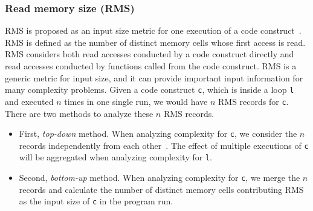 \subsubsection{Read memory size (RMS)}
RMS is proposed as an input size metric for one 
execution of a code construct~\cite{Aprof1,Aprof2}. 
RMS is defined as the number of distinct memory cells 
whose first access is read. 
RMS considers both read accesses conducted by a code construct directly 
and read accesses conducted by 
functions called from the code construct. 
RMS is a generic metric for input size, 
and it can provide important input information for many complexity problems.   
Given a code construct \texttt{c}, which is inside a loop \texttt{l} and executed
$n$ times in one single run, 
we would have $n$ RMS records for \texttt{c}. 
There are two methods to analyze these $n$ RMS records.

\begin{itemize}

\item First, \textit{top-down} method. 
When analyzing complexity for \texttt{c}, 
we consider the $n$ records independently from each other~\cite{Aprof1,Aprof2}. 
The effect of multiple executions of \texttt{c} 
will be aggregated when analyzing complexity for \texttt{l}.

\item Second, \textit{bottom-up} method. 
When analyzing complexity for \texttt{c}, 
we merge the $n$ records and calculate the number of distinct memory cells 
contributing RMS as the input size of \texttt{c} in the program run.

\end{itemize}



